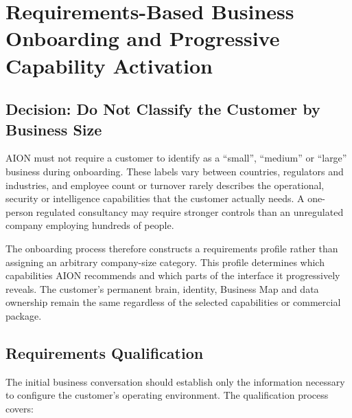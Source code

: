 \section{Requirements-Based Business Onboarding and Progressive Capability Activation}
\label{sec:aion-requirements-onboarding}

\subsection{Decision: Do Not Classify the Customer by Business Size}

AION must not require a customer to identify as a ``small'', ``medium'' or ``large'' business during
onboarding.  These labels vary between countries, regulators and industries, and employee count or
turnover rarely describes the operational, security or intelligence capabilities that the customer
actually needs.  A one-person regulated consultancy may require stronger controls than an
unregulated company employing hundreds of people.

The onboarding process therefore constructs a requirements profile rather than assigning an
arbitrary company-size category.  This profile determines which capabilities AION recommends and
which parts of the interface it progressively reveals.  The customer's permanent brain, identity,
Business Map and data ownership remain the same regardless of the selected capabilities or
commercial package.

\subsection{Requirements Qualification}

The initial business conversation should establish only the information necessary to configure the
customer's operating environment.  The qualification process covers:

